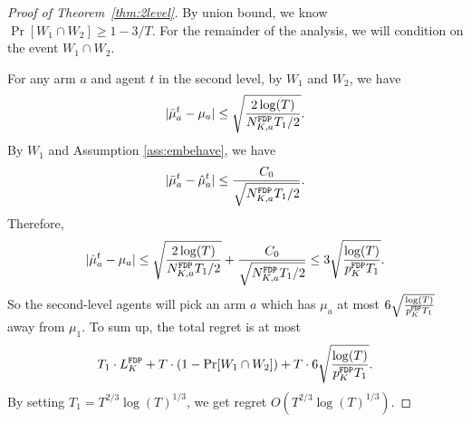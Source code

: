 \begin{proof}[Proof of Theorem~\ref{thm:2level}]
By union bound, we know $\Pr[W_1 \cap W_2] \geq 1 - 3/T$. For the
remainder of the analysis, we will condition on the event
$W_1 \cap W_2$.

For any arm $a$ and agent $t$ in the second level, by $W_1$ and $W_2$, we have
\[
|\bar{\mu}^t_a - \mu_a| \leq \sqrt{\frac{2\log(T)}{N^\mathtt{FDP}_{K,a} T_1 /2}}.
\]
By $W_1$ and Assumption \ref{ass:embehave}, we have
\[
|\bar{\mu}^t_a - \hat{\mu}^t_a| \leq \frac{C_0}{\sqrt{N^\mathtt{FDP}_{K,a} T_1/2}}.
\]
Therefore,
\[
|\hat{\mu}^t_a - \mu_a|\leq \sqrt{\frac{2\log(T)}{N^\mathtt{FDP}_{K,a} T_1 /2}}+\frac{C_0}{\sqrt{N^\mathtt{FDP}_{K,a} T_1/2}} \leq 3 \sqrt{\frac{\log(T)}{p^\mathtt{FDP}_K T_1 }}.
\]
So the second-level agents will pick an arm $a$ which has $\mu_a$ at most $6 \sqrt{\frac{\log(T)}{p^\mathtt{FDP}_K T_1 }}$ away from $\mu_1$. To sum up, the total regret is at most
\[
T_1 \cdot L^\mathtt{FDP}_K + T \cdot (1-\Pr[W_1 \cap W_2]) + T \cdot  6 \sqrt{\frac{\log(T)}{p^\mathtt{FDP}_K T_1 }}.
\]
By setting $T_1 = T^{2/3}\log(T)^{1/3}$, we get regret $O(T^{2/3}\log(T)^{1/3})$.
\end{proof}
